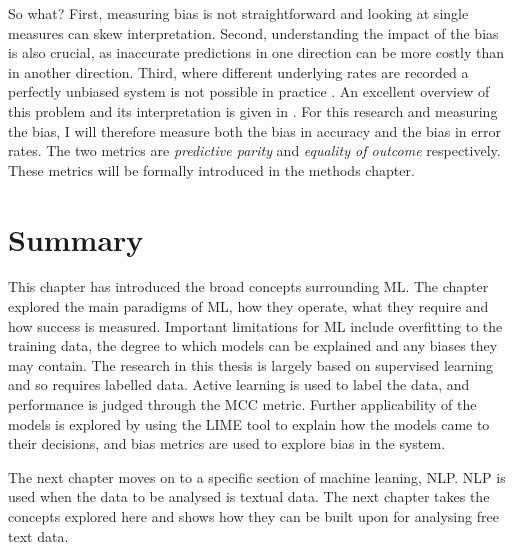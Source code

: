 So what? First, measuring bias is not straightforward and looking at single measures can skew interpretation. Second, understanding the impact of the bias is also crucial, as inaccurate predictions in one direction can be more costly than in another direction. Third, where different underlying rates are recorded a perfectly unbiased system is not possible in practice \parencite{kleinberg2016inherent}. An excellent overview of this problem and its interpretation is given in \parencite{hellman2020measuring}. For this research and measuring the bias, I will therefore measure both the bias in accuracy and the bias in error rates. The two metrics are \emph{predictive parity} and \emph{equality of outcome} respectively. These metrics will be formally introduced in the methods chapter.  



\section{Summary}

This chapter has introduced the broad concepts surrounding ML. The chapter explored the main paradigms of ML, how they operate, what they require and how success is measured. Important limitations for ML include overfitting to the training data, the degree to which models can be explained and any biases they may contain. The research in this thesis is largely based on supervised learning and so requires labelled data. Active learning is used to label the data, and performance is judged through the MCC metric. Further applicability of the models is explored by using the LIME tool to explain how the models came to their decisions, and bias metrics are used to explore bias in the system.

The next chapter moves on to a specific section of machine leaning, NLP. NLP is used when the data to be analysed is textual data. The next chapter takes the concepts explored here and shows how they can be built upon for analysing free text data.
